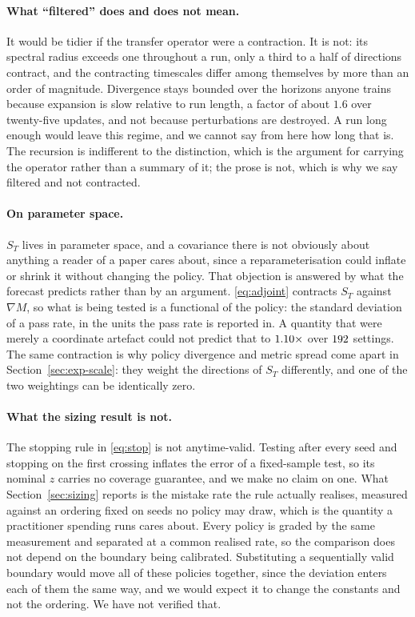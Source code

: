 \paragraph{What ``filtered'' does and does not mean.} It would be tidier if the transfer operator
were a contraction. It is not: its spectral radius exceeds one throughout a run, only a third to a
half of directions contract, and the contracting timescales differ among themselves by more than an
order of magnitude. Divergence stays bounded over the horizons anyone trains because expansion is
slow relative to run length, a factor of about $1.6$ over twenty-five updates, and not because
perturbations are destroyed. A run long enough would leave this regime, and we cannot say from here
how long that is. The recursion is indifferent to the distinction, which is the argument for
carrying the operator rather than a summary of it; the prose is not, which is why we say filtered
and not contracted.

\paragraph{On parameter space.} $S_T$ lives in parameter space, and a covariance there is not
obviously about anything a reader of a paper cares about, since a reparameterisation could inflate or
shrink it without changing the policy. That objection is answered by what the forecast predicts
rather than by an argument. \eqref{eq:adjoint} contracts $S_T$ against $\nabla M$, so what is being
tested is a functional of the policy: the standard deviation of a pass rate, in the units the pass
rate is reported in. A quantity that were merely a coordinate artefact could not predict that to
$1.10\times$ over $192$ settings. The same contraction is why
policy divergence and metric spread come apart in Section~\ref{sec:exp-scale}: they weight the
directions of $S_T$ differently, and one of the two weightings can be identically zero.

\paragraph{What the sizing result is not.} The stopping rule in \eqref{eq:stop} is not
anytime-valid. Testing after every seed and stopping on the first crossing inflates the error of a
fixed-sample test, so its nominal $z$ carries no coverage guarantee, and we make no claim on one.
What Section~\ref{sec:sizing} reports is the mistake rate the rule actually realises, measured
against an ordering fixed on seeds no policy may draw, which is the quantity a practitioner
spending runs cares about. Every policy is graded by the same measurement and separated at a common
realised rate, so the comparison does not depend on the boundary being calibrated. Substituting a
sequentially valid boundary would move all of these policies together, since the deviation enters
each of them the same way, and we would expect it to change the constants and not the ordering. We
have not verified that.

